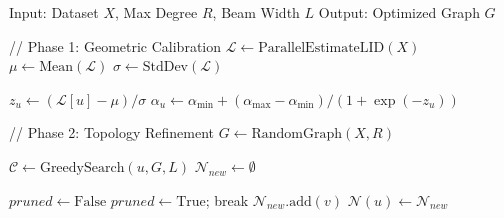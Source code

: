 \documentclass{article}
\theoremstyle{plain}
\theoremstyle{definition}
\theoremstyle{remark}
\begin{document}
\begin{algorithm}[h!]
   \caption{Manifold-Consistent Graph Indexing (MCGI)}
   \label{alg:mcgi}
\begin{algorithmic}
   \STATE Input: Dataset $X$, Max Degree $R$, Beam Width $L$
   \STATE Output: Optimized Graph $G$

   \STATE
   \STATE // Phase 1: Geometric Calibration
   \STATE $\mathcal{L} \leftarrow \text{ParallelEstimateLID}(X)$
   \STATE $\mu \leftarrow \text{Mean}(\mathcal{L})$
   \STATE $\sigma \leftarrow \text{StdDev}(\mathcal{L})$

       \STATE $z_u \leftarrow (\mathcal{L}[u] - \mu) / \sigma$
       \STATE $\alpha_u \leftarrow \alpha_{\min} + (\alpha_{\max} - \alpha_{\min}) / (1 + \exp(-z_u))$
   \ENDFOR

   \STATE 
   \STATE // Phase 2: Topology Refinement
   \STATE $G \leftarrow \text{RandomGraph}(X, R)$
   
           \STATE $\mathcal{C} \leftarrow \text{GreedySearch}(u, G, L)$
           \STATE $\mathcal{N}_{new} \leftarrow \emptyset$
           
               \STATE $pruned \leftarrow \text{False}$
                       \STATE $pruned \leftarrow \text{True}$; break
                   \ENDIF
               \ENDFOR
                   \STATE $\mathcal{N}_{new}.\text{add}(v)$
               \ENDIF
           \ENDFOR
           \STATE $\mathcal{N}(u) \leftarrow \mathcal{N}_{new}$
       \ENDFOR
   \ENDFOR
\end{algorithmic}
\end{algorithm}
\end{document}
